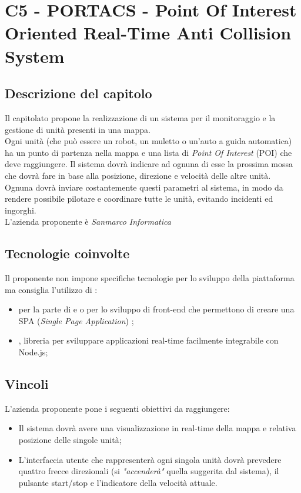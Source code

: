 \section{C5 - PORTACS - Point Of Interest Oriented Real-Time Anti Collision System}

\subsection{Descrizione del capitolo}
Il capitolato propone la realizzazione di un sistema per il monitoraggio e la gestione di unità presenti in una mappa.\\
Ogni unità (che può essere un robot, un muletto o un'auto a guida automatica) ha un punto di partenza nella mappa e una lista di \textit{Point Of Interest} (POI) che deve raggiungere.
Il sistema dovrà indicare ad ognuna di esse la prossima mossa che dovrà fare in base alla posizione, direzione e velocità  delle altre unità. Ognuna dovrà inviare costantemente questi parametri al sistema, in modo da rendere possibile pilotare e coordinare tutte le unità, evitando incidenti ed ingorghi.\\
L'azienda proponente è \textit{Sanmarco Informatica}

\subsection{Tecnologie coinvolte}
Il proponente non impone specifiche tecnologie per lo sviluppo della piattaforma ma consiglia l'utilizzo di :
\begin{itemize}
\item {} per la parte di  e  o   per lo sviluppo di front-end che permettono di creare una SPA (\textit{Single Page Application}) ;
\item {}, libreria per sviluppare applicazioni real-time facilmente integrabile con Node.js;
\end{itemize}

\subsection{Vincoli}
L'azienda proponente pone i seguenti obiettivi da raggiungere:

\begin{itemize}
\item Il sistema dovrà avere una visualizzazione in real-time della mappa e relativa posizione delle singole unità;
\item L'interfaccia utente che rappresenterà ogni singola unità dovrà prevedere quattro frecce direzionali (si \textit{"accenderà"} quella suggerita dal sistema), il pulsante start/stop e l'indicatore della velocità attuale.
\end{itemize}

